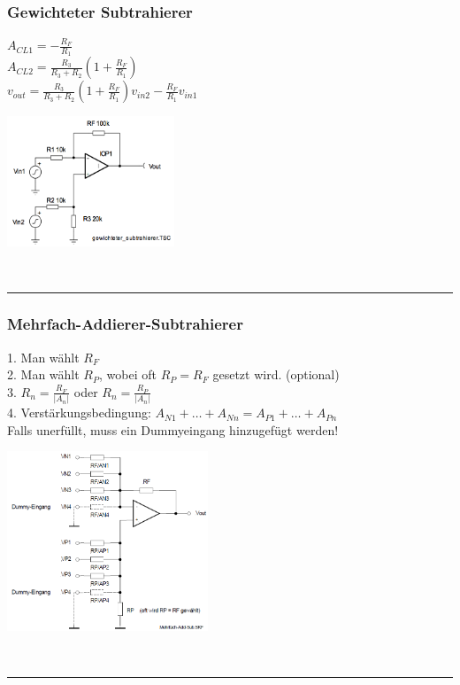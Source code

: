 		\begin{minipage}[c]{12cm}
		\subsubsection{Gewichteter Subtrahierer}
            	$A_{CL1}=- \frac{R_F}{R_1}$\\
            	$A_{CL2}=
           		\frac{R_3}{R_3+R_2}\left(1+\frac{R_F}{R_1}\right)$\\
            	$v_{out}=
            	\frac{R_3}{R_3+R_2}\left(1+\frac{R_F}{R_1}\right)
            	v_{in2}-\frac{R_F}{R_1}v_{in1}$\\
      	\end{minipage}
			\begin{minipage}{5cm}
            	\includegraphics[width=5cm]{./images/gewichtsub.png}
            \end{minipage}\\
\hrule

		\begin{minipage}[b]{12cm}
		\subsubsection{Mehrfach-Addierer-Subtrahierer} 		
			1. Man wählt $R_{F}$\\
			2. Man wählt $R_{P}$, wobei oft $R_{P}=R_{F}$ gesetzt wird. (optional)\\
			3. $R_{n}=\frac{R_{F}}{\left|A_{n}\right|}$ oder
				$R_{n}=\frac{R_{P}}{\left|A_{n}\right|}$\\ 
			4. Verstärkungsbedingung: $A_{N1} +
			\ldots + A_{Nn} = A_{P1} + \ldots + A_{Pn}$ \\Falls unerfüllt, muss ein Dummyeingang hinzugefügt werden!
		\end{minipage}
		\begin{minipage}{6cm}
          	\includegraphics[width=6cm]{./images/mehrfach-addierer-subtrahierer.png} 
        \end{minipage}\\
\hrule

